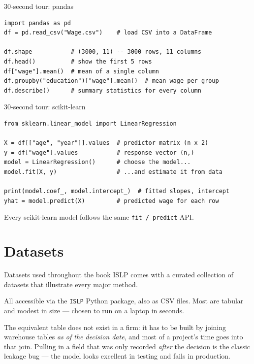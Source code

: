 \documentclass[aspectratio=169,11pt]{beamer}
\begin{document}
\begin{frame}[fragile]{30-second tour: pandas}
  \begin{lstlisting}
import pandas as pd
df = pd.read_csv("Wage.csv")    # load CSV into a DataFrame

df.shape           # (3000, 11) -- 3000 rows, 11 columns
df.head()          # show the first 5 rows
df["wage"].mean()  # mean of a single column
df.groupby("education")["wage"].mean()  # mean wage per group
df.describe()      # summary statistics for every column
  \end{lstlisting}
\end{frame}

\begin{frame}[fragile]{30-second tour: scikit-learn}
  \begin{lstlisting}
from sklearn.linear_model import LinearRegression

X = df[["age", "year"]].values  # predictor matrix (n x 2)
y = df["wage"].values           # response vector (n,)
model = LinearRegression()      # choose the model...
model.fit(X, y)                 # ...and estimate it from data

print(model.coef_, model.intercept_)  # fitted slopes, intercept
yhat = model.predict(X)         # predicted wage for each row
  \end{lstlisting}
  Every scikit-learn model follows the same \texttt{fit / predict}
  API.
\end{frame}


\section{Datasets}

\begin{frame}{Datasets used throughout the book}
  ISLP comes with a curated collection of datasets that illustrate
  every major method.
  \begin{takeaway}
    All accessible via the \texttt{ISLP} Python package, also as CSV
    files. Most are tabular and modest in size --- chosen to run on a
    laptop in seconds.
  \end{takeaway}
  \begin{industry}
    The equivalent table does not exist in a firm: it has to be built by joining warehouse
    tables \emph{as of the decision date}, and most of a project's time goes into that join.
    Pulling in a field that was only recorded \emph{after} the decision is the classic
    leakage bug --- the model looks excellent in testing and fails in production.
  \end{industry}
\end{frame}
\end{document}
